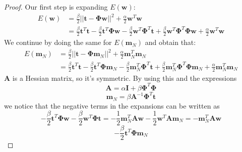 \vspace{1em}

\begin{proof}
    Our first step is expanding $E(\mathbf{w})$:
    \begin{align*}
        E(\mathbf{w})
        &= \frac{\beta}{2} ||\mathbf{t} - \mathbf{\Phi}\mathbf{w}||^2 
            + \frac{\alpha}{2} \mathbf{w}^T\mathbf{w} \tag{3.79} \\
        &= \frac{\beta}{2} \mathbf{t}^T\mathbf{t} 
            - \frac{\beta}{2} \mathbf{t}^T\mathbf{\Phi}\mathbf{w} 
            - \frac{\beta}{2} \mathbf{w}^T\mathbf{\Phi}^T\mathbf{t}
            + \frac{\beta}{2} \mathbf{w}^T\mathbf{\Phi}^T\mathbf{\Phi}\mathbf{w}
            + \frac{\alpha}{2} \mathbf{w}^T\mathbf{w}
    \end{align*}
    We continue by doing the same for $E(\mathbf{m}_N)$ and obtain that:
    \begin{align*}
        E(\mathbf{m}_N)
        &= \frac{\beta}{2} ||\mathbf{t} - \mathbf{\Phi}\mathbf{m}_N||^2 
            + \frac{\alpha}{2} \mathbf{m}_N^T\mathbf{m}_N \\
        &= \frac{\beta}{2} \mathbf{t}^T\mathbf{t} 
            - \frac{\beta}{2} \mathbf{t}^T\mathbf{\Phi}\mathbf{m}_N 
            - \frac{\beta}{2} \mathbf{m}_N^T\mathbf{\Phi}^T\mathbf{t}
            + \frac{\beta}{2} \mathbf{m}_N^T\mathbf{\Phi}^T\mathbf{\Phi}\mathbf{m}_N
            + \frac{\alpha}{2} \mathbf{m}_N^T\mathbf{m}_N
    \end{align*}
    $\mathbf{A}$ is a Hessian matrix, so it's symmetric. By using this
    and the expressions
    \begin{equation}\label{eq:3.81}\tag{3.81}
        \mathbf{A} = \alpha \mathbf{I} + \beta \mathbf{\Phi}^T\mathbf{\Phi}
    \end{equation}
    \vspace{-1em}
    \begin{equation}\label{eq:3.84}\tag{3.84}
        \mathbf{m}_N = \beta \mathbf{A}^{-1} \mathbf{\Phi}^T\mathbf{t}
    \end{equation}
    we notice that the negative terms in the expansions can be written as
    \[
        -\frac{\beta}{2} \mathbf{t}^T\mathbf{\Phi}\mathbf{w}
            - \frac{\beta}{2} \mathbf{w}^T\mathbf{\Phi}\mathbf{t}
        =  
        -\frac{1}{2} \mathbf{m}_N^T\mathbf{A}\mathbf{w}
            -\frac{1}{2} \mathbf{w}^T\mathbf{A}\mathbf{m}_N
        = 
        -\mathbf{m}_N^T\mathbf{A}\mathbf{w}
    \] 
    \[
        -\frac{\beta}{2} \mathbf{t}^T\mathbf{\Phi}\mathbf{m}_N
\]
\end{proof}

